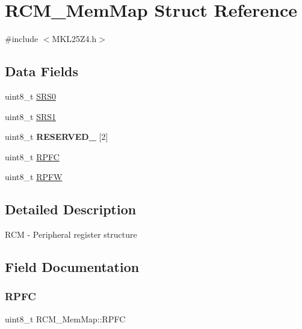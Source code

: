\hypertarget{struct_r_c_m___mem_map}{}\section{R\+C\+M\+\_\+\+Mem\+Map Struct Reference}
\label{struct_r_c_m___mem_map}


{\ttfamily \#include $<$M\+K\+L25\+Z4.\+h$>$}

\subsection*{Data Fields}
\begin{DoxyCompactItemize}
\item 
uint8\+\_\+t \hyperlink{struct_r_c_m___mem_map_aa28b91bdb2e1acc454f7bcb9ad26efb7}{S\+R\+S0}
\item 
uint8\+\_\+t \hyperlink{struct_r_c_m___mem_map_a8e7926e6f51e64e63e5ed3adb7aee612}{S\+R\+S1}
\item 
\mbox{\label{struct_r_c_m___mem_map_a5eaf5837cabca1357756d67c06f69ca6}} 
uint8\+\_\+t {\bfseries R\+E\+S\+E\+R\+V\+E\+D\+\_} \mbox{[}2\mbox{]}
\item 
uint8\+\_\+t \hyperlink{struct_r_c_m___mem_map_ace89c039f8342f8b5dd26c3c7b8309a2}{R\+P\+FC}
\item 
uint8\+\_\+t \hyperlink{struct_r_c_m___mem_map_ac458f95f6aa234285f568694a5b8240d}{R\+P\+FW}
\end{DoxyCompactItemize}


\subsection{Detailed Description}
R\+CM -\/ Peripheral register structure 

\subsection{Field Documentation}
\mbox{\label{struct_r_c_m___mem_map_ace89c039f8342f8b5dd26c3c7b8309a2}} 
\subsubsection{\texorpdfstring{R\+P\+FC}{RPFC}}
{\footnotesize\ttfamily uint8\+\_\+t R\+C\+M\+\_\+\+Mem\+Map\+::\+R\+P\+FC}

